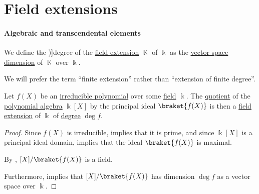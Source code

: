 \section{Field extensions}\label{sec:field_extensions}

\paragraph{Algebraic and transcendental elements}

\begin{definition}\label{def:field_extension_degree}
  We define the \term[ru=степень (def. \cite[9.5.1]{Винберг2014Алгебра})]{degree} of the \hyperref[def:field/submodel]{field extension} \( \BbbK \) of \( \Bbbk \) as the \hyperref[thm:vector_space_dimension]{vector space dimension} of \( \BbbK \) over \( \Bbbk \).

  We will prefer the term \enquote{finite extension} rather than \enquote{extension of finite degree}.
\end{definition}

\begin{lemma}\label{thm:quotient_by_irreducible_polynomial}
  Let \( f(X) \) be an \hyperref[def:domain_divisibility/irreducible]{irreducible polynomial} over some \hyperref[def:field]{field} \( \Bbbk \). The \hyperref[def:algebra_over_ring/quotient]{quotient} of the \hyperref[def:polynomial_algebra]{polynomial algebra} \( \Bbbk[X] \) by the principal ideal \( \braket{ f(X) } \) is then a \hyperref[def:field/submodel]{field extension} of \( \Bbbk \) of \hyperref[def:field_extension_degree]{degree} \( \deg f \).
\end{lemma}
\begin{proof}
  Since \( f(X) \) is irreducible,  implies that it is prime, and since \( \Bbbk[X] \) is a principal ideal domain,  implies that the ideal \( \braket{ f(X) } \) is maximal.

  By , \( \Bbbk[X] / \braket{ f(X) } \) is a field.

  Furthermore,  implies that \( \Bbbk[X] / \braket{ f(X) } \) has dimension \( \deg f \) as a vector space over \( \Bbbk \).
\end{proof}

